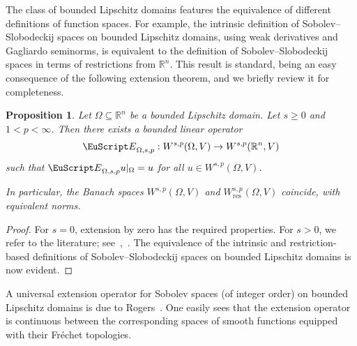 \documentclass[10pt,a4paper]{amsart}
\newtheorem{proposition}[theorem]{Proposition}
\theoremstyle{definition}
\theoremstyle{remark}
\numberwithin{equation}{section}
\newcommand{\bbR}{{\mathbb R}}
\newcommand{\euE}{{\EuScript E}}
\renewcommand{\restriction}{|}
\newcommand{\Domain}{{\Omega}}
\newcommand{\Extension}{\euE}
\newcommand{\Wint}{W}
\newcommand{\Wres}{W_{\mathrm{res}}}
\newcommand{\VEC}{{V}}
\begin{document}
The class of bounded Lipschitz domains features the equivalence of different definitions of function spaces.
For example, the intrinsic definition of Sobolev--Slobodeckij spaces on bounded Lipschitz domains,
using weak derivatives and Gagliardo seminorms, 
is equivalent to the definition of Sobolev--Slobodeckij spaces in terms of restrictions from $\bbR^{n}$. 
This result is standard, being an easy consequence of the following extension theorem, 
and we briefly review it for completeness.

\begin{proposition}\label{proposition:equivalence-of-sobolev-definitions}
    Let $\Domain \subseteq \bbR^{n}$ be a bounded Lipschitz domain.
    Let $s \geq 0$ and $1 < p < \infty$. 
    Then there exists a bounded linear operator 
    \begin{align*}
        \Extension_{\Domain,s,p} : \Wint^{s,p}(\Domain,\VEC) \to \Wint^{s,p}(\bbR^{n},\VEC)
    \end{align*}
    such that $\Extension_{\Domain,s,p} u \restriction_{\Domain} = u$ for all $u \in \Wint^{s,p}(\Domain,\VEC)$.
    
    In particular, the Banach spaces $\Wint^{s,p}(\Domain,\VEC)$ and $\Wres^{s,p}(\Domain,\VEC)$ coincide, with equivalent norms.
\end{proposition}
\begin{proof}
    For $s = 0$, extension by zero has the required properties.
    For $s > 0$, we refer to the literature; see~\cite[Theorem~1.4.3.1]{grisvard2011elliptic},~\cite{ern2021finite}.
    The equivalence of the intrinsic and restriction-based definitions of Sobolev--Slobodeckij spaces on bounded Lipschitz domains is now evident.
\end{proof}




A universal extension operator for Sobolev spaces (of integer order) on bounded Lipschitz domains is due to Rogers~\cite{rogers2006degree}. 
One easily sees that the extension operator is continuous between the corresponding spaces of smooth functions equipped with their Fr\'echet topologies.
\end{document}
